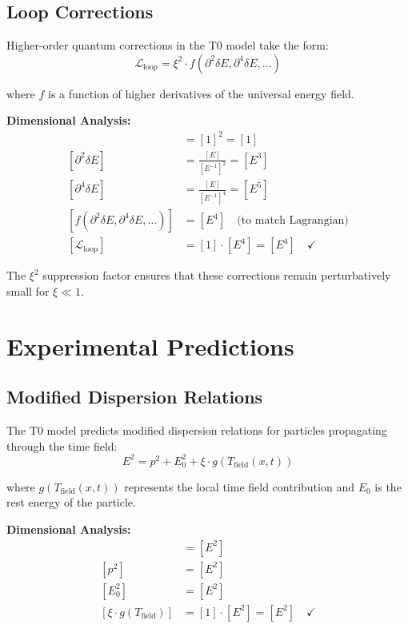 \documentclass[12pt,a4paper]{report}
\begin{document}
\subsection{Loop Corrections}

Higher-order quantum corrections in the T0 model take the form:
\begin{equation}
	\mathcal{L}_{\text{loop}} = \xi^2 \cdot f(\partial^2\delta E, \partial^4\delta E, \ldots)
\end{equation}

where $f$ is a function of higher derivatives of the universal energy field.

\textbf{Dimensional Analysis:}
\begin{align}
	[\xi^2] &= [1]^2 = [1] \\
	[\partial^2\delta E] &= \frac{[E]}{[E^{-1}]^2} = [E^3] \\
	[\partial^4\delta E] &= \frac{[E]}{[E^{-1}]^4} = [E^5] \\
	[f(\partial^2\delta E, \partial^4\delta E, \ldots)] &= [E^4] \quad \text{(to match Lagrangian)} \\
	[\mathcal{L}_{\text{loop}}] &= [1] \cdot [E^4] = [E^4] \quad \checkmark
\end{align}

The $\xi^2$ suppression factor ensures that these corrections remain perturbatively small for $\xi \ll 1$.	
	\section{Experimental Predictions}
	
	\subsection{Modified Dispersion Relations}
	
	The T0 model predicts modified dispersion relations for particles propagating through the time field:
	\begin{equation}
		E^2 = p^2 + E_0^2 + \xi \cdot g(T_{\text{field}}(x,t))
	\end{equation}
	
	where $g(T_{\text{field}}(x,t))$ represents the local time field contribution and $E_0$ is the rest energy of the particle.
	
	\textbf{Dimensional Analysis:}
	\begin{align}
		[E^2] &= [E^2] \\
		[p^2] &= [E^2] \\
		[E_0^2] &= [E^2] \\
		[\xi \cdot g(T_{\text{field}})] &= [1] \cdot [E^2] = [E^2] \quad \checkmark
	\end{align}
	
\end{document}
